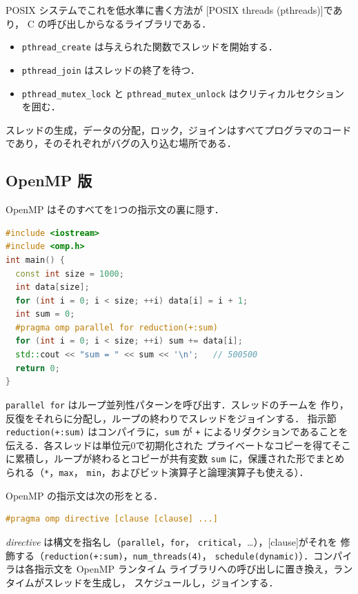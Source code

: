 \documentclass[../main.tex]{subfiles}
\begin{document}
POSIX システムでこれを低水準に書く方法が
[POSIX threads (pthreads)]であり，
C の呼び出しからなるライブラリである．
\begin{itemize}
  \item \texttt{pthread\_create} は与えられた関数でスレッドを開始する．
  \item \texttt{pthread\_join} はスレッドの終了を待つ．
  \item \texttt{pthread\_mutex\_lock} と \texttt{pthread\_mutex\_unlock}
    はクリティカルセクションを囲む．
\end{itemize}
スレッドの生成，データの分配，ロック，ジョインはすべてプログラマのコード
であり，そのそれぞれがバグの入り込む場所である．

\subsection{OpenMP 版}

OpenMP はそのすべてを1つの指示文の裏に隠す．
\begin{lstlisting}[language=C++, numbers=none]
#include <iostream>
#include <omp.h>
int main() {
  const int size = 1000;
  int data[size];
  for (int i = 0; i < size; ++i) data[i] = i + 1;
  int sum = 0;
  #pragma omp parallel for reduction(+:sum)
  for (int i = 0; i < size; ++i) sum += data[i];
  std::cout << "sum = " << sum << '\n';   // 500500
  return 0;
}
\end{lstlisting}
\texttt{parallel for} はループ並列性パターンを呼び出す．スレッドのチームを
作り，反復をそれらに分配し，ループの終わりでスレッドをジョインする．
指示節 \texttt{reduction(+:sum)} はコンパイラに，\texttt{sum} が \texttt{+}
によるリダクションであることを伝える．各スレッドは単位元0で初期化された
プライベートなコピーを得てそこに累積し，ループが終わるとコピーが共有変数
\texttt{sum} に，保護された形でまとめられる（\texttt{*}，\texttt{max}，
\texttt{min}，およびビット演算子と論理演算子も使える）．

\begin{definition}[指示文と指示節]
  OpenMP の指示文は次の形をとる．
\begin{lstlisting}[language=C++, numbers=none]
#pragma omp directive [clause [clause] ...]
\end{lstlisting}
  \textit{directive} は構文を指名し（\texttt{parallel}，\texttt{for}，
  \texttt{critical}，\ldots），[clause]がそれを
  修飾する（\texttt{reduction(+:sum)}，\texttt{num\_threads(4)}，
  \texttt{schedule(dynamic)}）．コンパイラは各指示文を OpenMP ランタイム
  ライブラリへの呼び出しに置き換え，ランタイムがスレッドを生成し，
  スケジュールし，ジョインする．
\end{definition}
\end{document}
